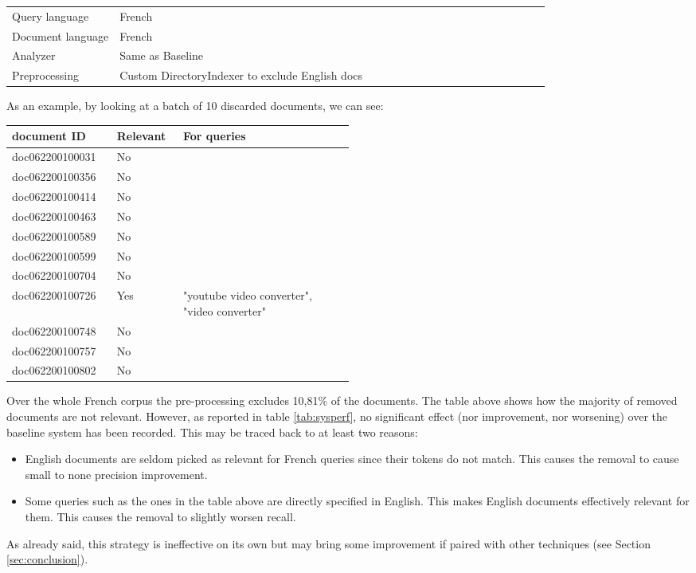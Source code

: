 \begin{table}[h!]
    \centering
    \begin{tabular}{l p{0.8\linewidth}}
    Query language & French\\
    Document language & French\\
    Analyzer & Same as Baseline\\
    Preprocessing & Custom DirectoryIndexer to exclude English docs
    \end{tabular}
\end{table}
As an example, by looking at a batch of 10 discarded documents, we can see:
\begin{table}[h!]
  \centering
  \begin{tabular}{|l|l|p{0.5\linewidth}|}
    \toprule
    document ID&Relevant&For queries\\
    \midrule
    doc062200100031&No&\\
    doc062200100356&No&\\
    doc062200100414&No&\\
    doc062200100463&No&\\
    doc062200100589&No&\\
    doc062200100599&No&\\
    doc062200100704&No&\\
    doc062200100726&Yes&"youtube video converter", "video converter" \\
    doc062200100748&No&\\
    doc062200100757&No&\\
    doc062200100802&No&\\
  \bottomrule
\end{tabular}
\end{table}
\par Over the whole French corpus the pre-processing excludes 10,81\% of the documents. The table above shows how the majority of removed documents are not relevant. However, as reported in table \ref{tab:sysperf}, no significant effect (nor improvement, nor worsening) over the baseline system has been recorded. This may be traced back to at least two reasons:
\begin{itemize}
    \item English documents are seldom picked as relevant for French queries since their tokens do not match. This causes the removal to cause small to none precision improvement.
    \item Some queries such as the ones in the table above are directly specified in English. This makes English documents effectively relevant for them. This causes the removal to slightly worsen recall.
\end{itemize}
As already said, this strategy is ineffective on its own but may bring some improvement if paired with other techniques (see Section \ref{sec:conclusion}).

